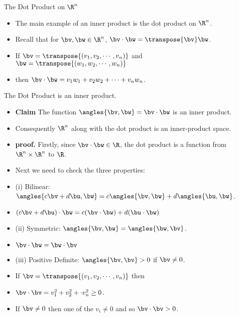 \documentclass{beamer}
\begin{document}

\begin{frame}{The Dot Product on  $\R^n$}

\begin{itemize}
\item The main example of an inner product is the dot product on $\R^n$.
\item Recall that for $\bv,\bw\in\R^n$, $\bv\cdot\bw = \transpose{\bv}\bw$.
\item If $\bv = \transpose{(v_1,v_2,\cdots,v_n)}$ and $\bw = \transpose{(w_1,w_2,\cdots,w_n)}$
\item then $\bv\cdot\bw = v_1 w_1 + v_2 w_2 + \cdots + v_n w_n$.
\end{itemize}
\end{frame}


\begin{frame}{The Dot Product is an inner product.}

\begin{itemize}
\item \textbf{Claim} The function $\angles{\bv,\bw} = \bv\cdot\bw$ is an inner product.
\item Consequently $\R^n$ along with the dot product is an inner-product space.
\item \textbf{proof.} Firstly, since $\bv\cdot\bw\in\R$,  the dot product
is a function from $\R^n\times\R^n$ to $\R$.
\item Next we need to check the three properties:
\item (i) Bilinear: $\angles{c\bv+d\bu,\bw} = c\angles{\bv,\bw} + d\angles{\bu,\bw}$.
\item $(c\bv+d\bu) \cdot \bw = c(\bv\cdot\bw) + d(\bu\cdot\bw)$
\item (ii) Symmetric: $\angles{\bv,\bw}=\angles{\bw,\bv}$.
\item $\bv\cdot\bw = \bw \cdot \bv$
\item (iii) Positive Definite: $\angles{\bv,\bv} > 0$ if $\bv\not=0$.
\item If $\bv = \transpose{(v_1,v_2,\cdots,v_n)}$ then
\item $\bv\cdot\bv = v_1^2 + v_2^2 + \cdot v_n^2 \geq 0$.
\item If $\bv\not=0$  then one of the $v_i\not=0$ and so $\bv\cdot\bv > 0$.
\end{itemize}
\end{frame}
\end{document}
